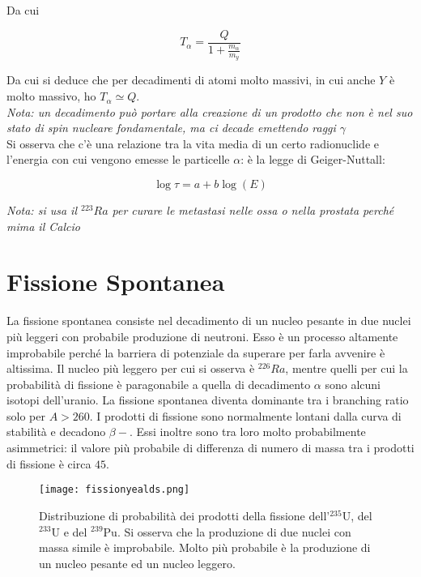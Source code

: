 \documentclass [a4paper, twoside] {book}
\begin{document}
Da cui

\begin{equation}
T_{\alpha}=\frac{Q}{1+\frac{m_{\alpha}}{m_y}} 
\end{equation}

Da cui si deduce che per decadimenti di atomi molto massivi, in cui anche $Y$ è molto massivo, ho $T_{\alpha}\simeq Q$.\\

\emph{Nota: un decadimento può portare alla creazione di un prodotto che non è nel suo stato di spin nucleare fondamentale, ma ci decade emettendo raggi $\gamma$ }\\

Si osserva che c'è una relazione tra la vita media di un certo radionuclide e l'energia con cui vengono emesse le particelle $\alpha$: è la legge di Geiger-Nuttall:

\begin{equation}
\log \tau = a + b \log (E)
\end{equation}

\emph{Nota: si usa il $^{223}Ra$ per curare le metastasi nelle ossa o nella prostata perché mima il Calcio}

\section{Fissione Spontanea}

La fissione spontanea consiste nel decadimento di un nucleo pesante in due nuclei più leggeri con probabile produzione di neutroni. Esso è un processo altamente improbabile perché la barriera di potenziale da superare per farla avvenire è altissima. Il nucleo più leggero per cui si osserva è $^{226}Ra$, mentre quelli per cui la probabilità di fissione è paragonabile a quella di decadimento $\alpha$ sono alcuni isotopi dell'uranio. La fissione spontanea diventa dominante tra i branching ratio solo per $A>260$.
I prodotti di fissione sono normalmente lontani dalla curva di stabilità e decadono $\beta-$. 
Essi inoltre sono tra loro molto probabilmente asimmetrici: il valore più probabile di differenza di numero di massa tra i prodotti di fissione è circa $45$.

\begin{figure} []
\centering
		\texttt{[image: fissionyealds.png]}
		\caption{Distribuzione di probabilità dei prodotti della fissione dell'$^{235}\text{U}$, del $^{233}\text{U}$ e del $^{239}\text{Pu}$. Si osserva che la produzione di due nuclei con massa simile è improbabile. Molto più probabile è la produzione di un nucleo pesante ed un nucleo leggero.}
         \label{fissionyealds}
\end{figure}
\end{document}
